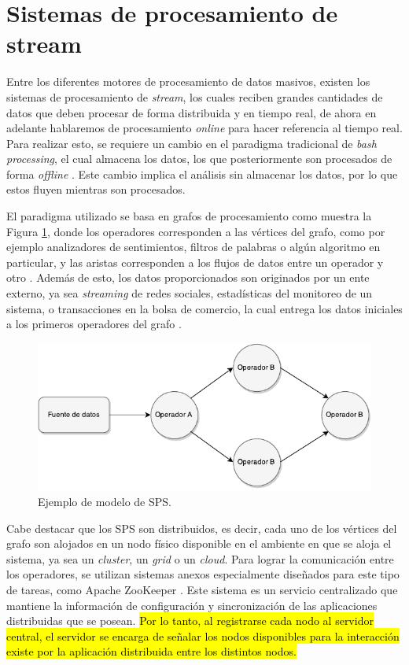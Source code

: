 \section{Sistemas de procesamiento de stream}
\label{sec:SPS}

Entre los diferentes motores de procesamiento de datos masivos, existen los sistemas de procesamiento de \textsl{stream}, los cuales reciben grandes cantidades de datos que deben procesar de forma distribuida y en tiempo real, de ahora en adelante hablaremos de procesamiento \textsl{online} para hacer referencia al tiempo real. Para realizar esto, se requiere un cambio en el paradigma tradicional de \textsl{bash processing}, el cual almacena los datos, los que posteriormente son procesados de forma \textsl{offline} \citep{HawwashN14}. Este cambio implica el análisis sin almacenar los datos, por lo que estos fluyen mientras son procesados.

El paradigma utilizado se basa en grafos de procesamiento como muestra la Figura \ref{fig:grafo}, donde los operadores corresponden a las vértices del grafo, como por ejemplo analizadores de sentimientos, filtros de palabras o algún algoritmo en particular, y las aristas corresponden a los flujos de datos entre un operador y otro \citep{Shahrivari14}. Además de esto, los datos proporcionados son originados por un ente externo, ya sea \textit{streaming} de redes sociales, estadísticas del monitoreo de un sistema, o transacciones en la bolsa de comercio, la cual entrega los datos iniciales a los primeros operadores del grafo \citep{AppelFFB12}.

\begin{figure}[ht!]
  \centering
    \includegraphics[scale=1]{images/SPS.pdf}
  \caption{Ejemplo de modelo de SPS.}
  \label{fig:grafo}
\end{figure}

Cabe destacar que los SPS son distribuidos, es decir, cada uno de los vértices del grafo son alojados en un nodo físico disponible en el ambiente en que se aloja el sistema, ya sea un \textit{cluster}, un \textit{grid} o un \textit{cloud}. Para lograr la comunicación entre los operadores, se utilizan sistemas anexos especialmente diseñados para este tipo de tareas, como Apache ZooKeeper \citep{HuntKJR10}. Este sistema es un servicio centralizado que mantiene la información de configuración y sincronización de las aplicaciones distribuidas que se posean. \hl{Por lo tanto, al registrarse cada nodo al servidor central, el servidor se encarga de señalar los nodos disponibles para la interacción existe por la aplicación distribuida entre los distintos nodos.}

